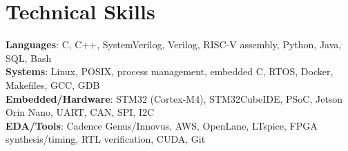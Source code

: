 \documentclass[letterpaper,11pt]{article}
\begin{document}
\vspace{-8pt}
\section{Technical Skills}
 \begin{itemize}[leftmargin=0.15in, label={}]
    \small{\item{
      \textbf{Languages}{: C, C++, SystemVerilog, Verilog, RISC-V assembly, Python, Java, SQL, Bash} \\
      \textbf{Systems}{: Linux, POSIX, process management, embedded C, RTOS, Docker, Makefiles, GCC, GDB} \\
      \textbf{Embedded/Hardware}{: STM32 (Cortex-M4), STM32CubeIDE, PSoC, Jetson Orin Nano, UART, CAN, SPI, I2C} \\
      \textbf{EDA/Tools}{: Cadence Genus/Innovus, AWS, OpenLane, LTspice, FPGA synthesis/timing, RTL verification, CUDA, Git}
    }}
 \end{itemize}


\end{document}
